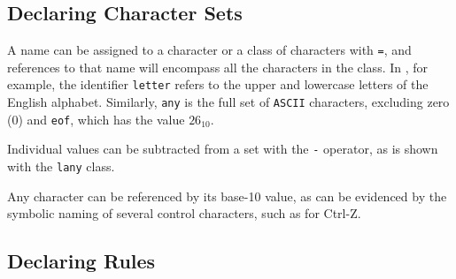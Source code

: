 \subsection{Declaring Character Sets}
A name can be assigned to a character or a class of characters with
\texttt{=}, and references to that name will encompass all the
characters in the class.  In , for example, the
identifier \texttt{letter} refers to the upper and lowercase letters
of the English alphabet.  Similarly, \texttt{any} is the full set of
\texttt{ASCII} characters, excluding zero (0) and \texttt{eof}, which
has the value $26_{10}$.

Individual values can be subtracted from a set with the \texttt{-}
operator, as is shown with the \texttt{lany} class.

Any character can be referenced by its base-10 value, as can be
evidenced by the symbolic naming of several control characters, such
as \texttt{} for Ctrl-Z.


\subsection{Declaring Rules}

